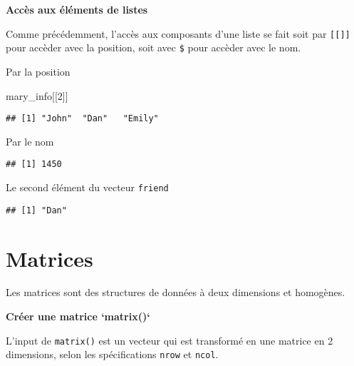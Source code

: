 \documentclass[]{book}
\newenvironment{Shaded}{\begin{snugshade}}{\end{snugshade}}
\newcommand{\DecValTok}[1]{\textcolor[rgb]{0.00,0.00,0.81}{#1}}
\newcommand{\NormalTok}[1]{#1}
\newcommand{\OperatorTok}[1]{\textcolor[rgb]{0.81,0.36,0.00}{\textbf{#1}}}
\begin{document}
\textbf{Accès aux éléments de listes}

Comme précédemment, l'accès aux composants d'une liste se fait soit par \texttt{{[}{[}{]}{]}} pour accèder avec la position, soit avec \texttt{\$} pour accèder avec le nom.

Par la position

\begin{Shaded}
\begin{Highlighting}[]
\NormalTok{mary_info[[}\DecValTok{2}\NormalTok{]]}
\end{Highlighting}
\end{Shaded}

\begin{verbatim}
## [1] "John"  "Dan"   "Emily"
\end{verbatim}

Par le nom

\begin{Shaded}
\end{Shaded}

\begin{verbatim}
## [1] 1450
\end{verbatim}

Le second élément du vecteur \texttt{friend}

\begin{Shaded}
\end{Shaded}

\begin{verbatim}
## [1] "Dan"
\end{verbatim}

\hypertarget{matrices-1}{%
\section{Matrices}\label{matrices-1}}

Les matrices sont des structures de données à deux dimensions et homogènes.

\textbf{Créer une matrice `matrix()`}

L'input de \texttt{matrix()} est un vecteur qui est transformé en une matrice en 2 dimensions, selon les spécifications \texttt{nrow} et \texttt{ncol}.
\end{document}

